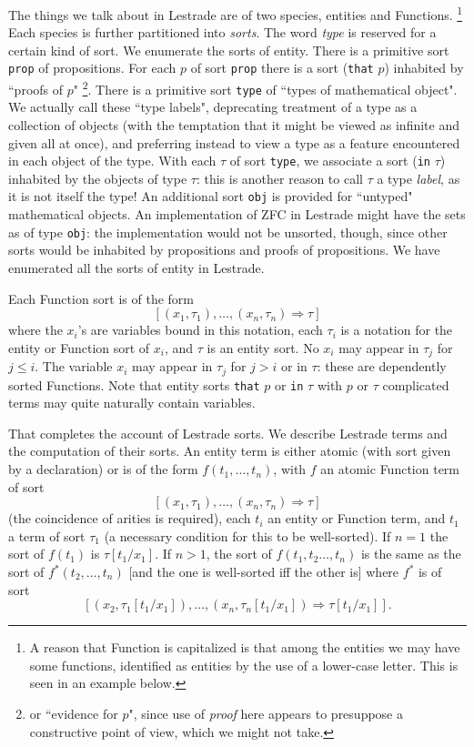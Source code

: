 \documentclass{article}
\begin{document}
The things we talk about in Lestrade are of two species, entities and Functions.  \footnote{A reason that Function is capitalized is that among the entities we may have some functions, identified as entities by the use of a lower-case letter.  This is seen in an example below.}  Each species is further partitioned into {\em sorts\/}.  The word {\em type\/} is reserved for a certain kind of sort.  We enumerate the sorts of entity.  There is a primitive sort {\tt prop} of propositions.  For each $p$ of sort
{\tt prop} there is a sort ({\tt that} $p$) inhabited by ``proofs of $p$" \footnote{or ``evidence for $p$", since use of {\em proof\/} here appears to presuppose a constructive point of view, which we might not take.}.  There is a primitive sort {\tt type\/} of ``types of mathematical object".  We actually call these ``type labels",  deprecating treatment of a type as a collection of objects (with the temptation that it might be viewed as infinite and given all at once), and preferring instead to view a type as a feature encountered in each object of the type.  With each $\tau$ of sort {\tt type}, we associate a sort ({\tt in} $\tau$) inhabited by the objects of type $\tau$:  this is another reason to call $\tau$ a type {\em label\/}, as it is not itself the type!  An additional sort {\tt obj} is provided for ``untyped" mathematical objects.  An implementation of ZFC in Lestrade might have the sets as of type {\tt obj}:  the implementation would not be unsorted, though, since other sorts would be inhabited by propositions and proofs of propositions.  We have enumerated all the sorts of entity in Lestrade.

Each Function sort is of the form $$[(x_1,\tau_1),\ldots,(x_n,\tau_n) \Rightarrow \tau]$$  where the $x_i$'s are variables bound in this notation, each $\tau_i$ is a notation for the entity or Function sort of $x_i$, and $\tau$ is an entity sort.  No $x_i$ may appear in $\tau_j$ for $j\leq i$.  The variable $x_i$ may appear in $\tau_j$ for $j>i$ or in $\tau$:  these are dependently sorted Functions.  Note that entity sorts {\tt that} $p$ or {\tt in} $\tau$ with $p$ or $\tau$ complicated terms may quite naturally contain variables.

That completes the account of Lestrade sorts.  We describe Lestrade terms and the computation of their sorts.  An entity term is either atomic (with  sort given by a declaration) or is of the form $f(t_1,\ldots,t_n)$, with $f$ an atomic Function term of sort
$$[(x_1,\tau_1),\ldots,(x_n,\tau_n) \Rightarrow \tau]$$ (the coincidence of arities is required), each $t_i$ an entity or Function term, and $t_1$ a term of sort $\tau_1$ (a necessary condition for this to be well-sorted).  If $n=1$ the sort
of $f(t_1)$ is $\tau[t_1/x_1]$.  If $n>1$, the sort of $f(t_1,t_2\ldots,t_n)$ is the same as the sort of $f^*(t_2,\ldots,t_n)$ [and the one is well-sorted iff the other is] where $f^*$ is of sort
$$[(x_2,\tau_1[t_1/x_1]),\ldots,(x_n,\tau_n[t_1/x_1]) \Rightarrow \tau[t_1/x_1]].$$
\end{document}
